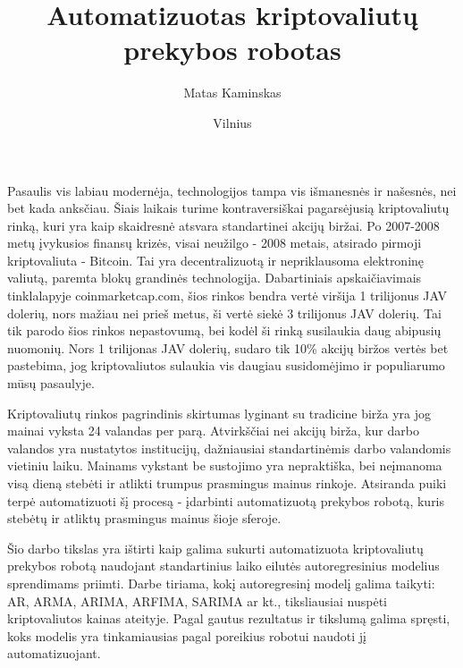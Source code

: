 \documentclass{VUMIFInfKursinis}
\institute{Informatikos institutas}  %
\title{Automatizuotas kriptovaliutų prekybos robotas}
\author{Matas Kaminskas}
\date{Vilnius \\ \the\year}
\begin{document}
\maketitle

\tableofcontents

Pasaulis vis labiau modernėja, technologijos tampa vis išmanesnės ir našesnės, nei bet kada anksčiau. Šiais laikais turime kontraversiškai pagarsėjusią
kriptovaliutų rinką, kuri yra kaip skaidresnė atsvara standartinei akcijų biržai. Po 2007-2008 metų įvykusios finansų krizės,
visai neužilgo - \cite{SatBitcoin}2008 metais, atsirado pirmoji kriptovaliuta - Bitcoin. Tai yra decentralizuotą ir nepriklausoma elektroninę valiutą, paremta
blokų grandinės technologija. Dabartiniais apskaičiavimais tinklalapyje coinmarketcap.com, šios rinkos bendra vertė viršija 1 trilijonus JAV dolerių,
nors mažiau nei prieš metus, ši vertė siekė 3 trilijonus JAV dolerių. Tai tik parodo šios rinkos nepastovumą, bei kodėl ši rinką susilaukia
daug abipusių nuomonių. Nors 1 trilijonas JAV dolerių, sudaro tik 10\% akcijų biržos vertės bet pastebima, jog kriptovaliutos 
sulaukia vis daugiau susidomėjimo ir populiarumo mūsų pasaulyje.    


Kriptovaliutų rinkos pagrindinis skirtumas lyginant su tradicine birža yra jog mainai vyksta 24 valandas per parą. Atvirkščiai nei akcijų birža, kur
darbo valandos yra nustatytos institucijų, dažniausiai standartinėmis darbo valandomis vietiniu laiku. Mainams vykstant be sustojimo yra nepraktiška,
bei neįmanoma visą dieną stebėti ir atlikti trumpus prasmingus mainus rinkoje. Atsiranda puiki terpė automatizuoti šį procesą - įdarbinti automatizuotą
prekybos robotą, kuris stebėtų ir atliktų prasmingus mainus šioje sferoje.


Šio darbo tikslas yra ištirti kaip galima sukurti automatizuota kriptovaliutų prekybos robotą naudojant standartinius laiko eilutės autoregresinius modelius
sprendimams priimti. Darbe tiriama, kokį autoregresinį modelį galima taikyti: AR, ARMA, ARIMA, ARFIMA, SARIMA ar kt., tiksliausiai nuspėti kriptovaliutos
kainas ateityje. Pagal gautus rezultatus ir tikslumą galima spręsti, koks modelis yra tinkamiausias pagal poreikius robotui naudoti jį automatizuojant.
\end{document}

